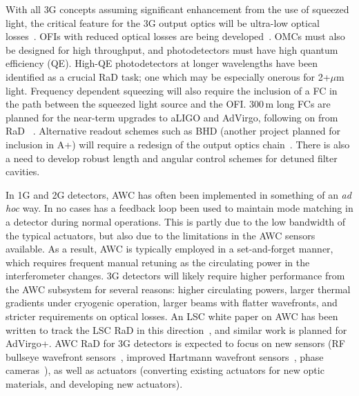 With all \ac{3G}   concepts assuming significant enhancement from the use of squeezed light, the critical feature for the \ac{3G}   output optics will be ultra-low optical losses~\cite{squeeze_lossbudget}. \acp{OFI} with reduced optical losses are being developed~\cite{EGOLLFI,UFLLFI}.
\Acp{OMC} must also be designed for high throughput, and photodetectors must have high quantum efficiency (QE). High-QE photodetectors at longer wavelengths have been identified as a crucial \ac{RaD}  task; one which may be especially onerous for 2+$\mu$m light. 
Frequency dependent squeezing will also require the inclusion of a \ac{FC} in the path between the squeezed light source and the OFI. 300\,m long \acp{FC} are planned for the near-term upgrades to \ac{aLIGO} and \ac{AdVirgo}, following on from \ac{RaD} ~\cite{MITFC,TAMA_FDS2016}.
Alternative readout schemes such as \ac{BHD} (another project planned for inclusion in \ac{A+}) will require a redesign of the output optics chain~\cite{BHD}. There is also a need to develop robust length and angular control schemes for detuned filter cavities.

In \ac{1G} and \ac{2G} detectors, \ac{AWC} has often been implemented in something of an \emph{ad hoc} way. In no cases has a feedback loop been used to maintain mode matching in a detector during normal operations. This is partly due to the low bandwidth of the typical actuators, but also due to the limitations in the \ac{AWC}  sensors available. As a result, \ac{AWC}  is typically employed in a set-and-forget manner, which requires frequent manual retuning as the circulating power in the interferometer changes. \ac{3G}   detectors will likely require higher performance from the \ac{AWC}  subsystem for several reasons: higher circulating powers, larger thermal gradients under cryogenic operation, larger beams with flatter wavefronts, and stricter requirements on optical losses. An \ac{LSC} white paper on \ac{AWC}  has been written to track the LSC \ac{RaD}  in this direction~\cite{aLIGO_AWC}, and similar work is planned for AdVirgo+. \ac{AWC}  \ac{RaD}  for \ac{3G}   detectors is expected to focus on new sensors (\ac{RF} bullseye wavefront sensors~\cite{bullseye}, improved Hartmann wavefront sensors~\cite{HWS}, phase cameras~\cite{phasecam}), as well as actuators (converting existing actuators for new optic materials, and developing new actuators). 

